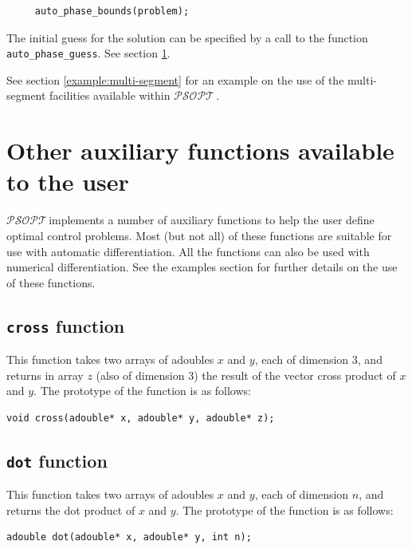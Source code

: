 \documentclass[a4paper,11pt]{report}    %
\newcommand{\psopt}{$\mathcal{PSOPT}$\,}  %
\begin{document}
\begin{verbatim}
     auto_phase_bounds(problem);
\end{verbatim}


The initial guess for the solution can be specified by a call to the 
function \verb|auto_phase_guess|. See section \ref{sec:auxiliary}.

See  section \ref{example:multi-segment}  for an example on the use of the multi-segment 
facilities available within \psopt.


\section{Other auxiliary functions available to the user}
\label{sec:auxiliary}
\psopt implements a number of auxiliary functions to help the user define
optimal control problems. Most (but not all) of these functions are suitable for use with automatic differentiation.
All the functions can also be used with numerical differentiation. See the examples section for further details 
on the use of these functions.


\subsection{ \texttt{cross} function}

This function takes two arrays of adoubles $x$ and $y$, each of dimension 3, and returns in
array $z$ (also of dimension 3) the result of the vector cross
product of $x$ and $y$. The prototype of the function is as follows:

\begin{verbatim}
void cross(adouble* x, adouble* y, adouble* z);
\end{verbatim}


\subsection{ \texttt{dot} function}

This function takes two arrays of adoubles $x$ and $y$, each of dimension $n$, and returns the 
dot product of $x$ and $y$. The prototype of the function is as follows:

\begin{verbatim}
adouble dot(adouble* x, adouble* y, int n);
\end{verbatim}

\end{document}
